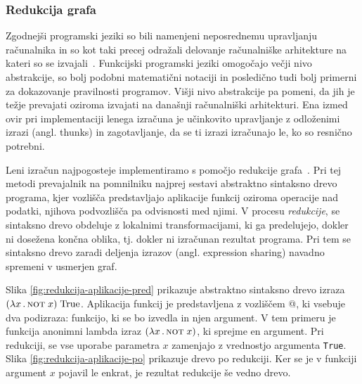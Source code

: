 \subsubsection{Redukcija grafa}

Zgodnejši programski jeziki so bili namenjeni neposrednemu upravljanju ra\-ču\-nal\-ni\-ka in so kot taki precej odražali delovanje računalniške arhitekture na kateri so se izvajali~\cite{hudak1989conception}. Funkcijski programski jeziki omogočajo večji nivo abstrakcije, so bolj podobni matematični notaciji in posledično tudi bolj primerni za dokazovanje pravilnosti programov. Višji nivo abstrakcije pa pomeni, da jih je težje prevajati oziroma izvajati na današnji računalniški arhitekturi. Ena izmed ovir pri implementaciji lenega izračuna je učinkovito upravljanje z odloženimi izrazi (angl. thunks) in zagotavljanje, da se ti izrazi izračunajo le, ko so resnično potrebni.

Leni izračun najpogosteje implementiramo s pomočjo redukcije gra\-fa~\cite{hudak1989conception, peyton1987implementation}. Pri tej metodi prevajalnik na pomnilniku najprej sestavi abstraktno sintaksno drevo programa, kjer vozlišča predstavljajo aplikacije funkcij oziroma operacije nad podatki, njihova podvozlišča pa odvisnosti med njimi. V procesu \textit{redukcije}, se sintaksno drevo obdeluje z lokalnimi transformacijami, ki ga predelujejo, dokler ni dosežena končna oblika, tj. dokler ni izračunan rezultat programa. Pri tem se sintaksno drevo zaradi deljenja izrazov (angl. expression sharing) navadno spremeni v usmerjen graf.

Slika \ref{fig:redukcija-aplikacije-pred} prikazuje abstraktno sintaksno drevo izraza $(\lambda x \, . \, \textsc{not} \; x) \; \text{True}$. Aplikacija funkcij je predstavljena z vozliščem @, ki vsebuje dva podizraza: funkcijo, ki se bo izvedla in njen argument. V tem primeru je funkcija anonimni lambda izraz $(\lambda x \, . \, \textsc{not} \; x)$, ki sprejme en argument. Pri redukciji, se vse uporabe parametra $x$ zamenjajo z vrednostjo argumenta \texttt{True}. Slika \ref{fig:redukcija-aplikacije-po} prikazuje drevo po redukciji. Ker se je v funkciji argument $x$ pojavil le enkrat, je rezultat redukcije še vedno drevo.

